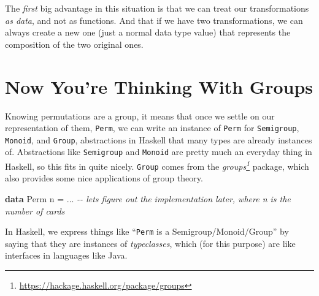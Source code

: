 \documentclass[]{article}
\newenvironment{Shaded}{}{}
\newcommand{\CommentTok}[1]{\textcolor[rgb]{0.38,0.63,0.69}{\textit{#1}}}
\newcommand{\DataTypeTok}[1]{\textcolor[rgb]{0.56,0.13,0.00}{#1}}
\newcommand{\KeywordTok}[1]{\textcolor[rgb]{0.00,0.44,0.13}{\textbf{#1}}}
\newcommand{\NormalTok}[1]{#1}
\newcommand{\OperatorTok}[1]{\textcolor[rgb]{0.40,0.40,0.40}{#1}}
\newcommand{\OtherTok}[1]{\textcolor[rgb]{0.00,0.44,0.13}{#1}}
\renewcommand{\href}[2]{#2\footnote{\url{#1}}}
\begin{document}
The \emph{first} big advantage in this situation is that we can treat our
transformations \emph{as data}, and not as functions. And that if we have two
transformations, we can always create a new one (just a normal data type value)
that represents the composition of the two original ones.

\section{Now You're Thinking With Groups}\label{now-youre-thinking-with-groups}

Knowing permutations are a group, it means that once we settle on our
representation of them, \texttt{Perm}, we can write an instance of \texttt{Perm}
for \texttt{Semigroup}, \texttt{Monoid}, and \texttt{Group}, abstractions in
Haskell that many types are already instances of. Abstractions like
\texttt{Semigroup} and \texttt{Monoid} are pretty much an everyday thing in
Haskell, so this fits in quite nicely. \texttt{Group} comes from the
\emph{\href{https://hackage.haskell.org/package/groups}{groups}} package, which
also provides some nice applications of group theory.

\begin{Shaded}
\begin{Highlighting}[]
\KeywordTok{data} \DataTypeTok{Perm}\NormalTok{ n }\OtherTok{=} \OperatorTok{...} \CommentTok{{-}{-} let\textquotesingle{}s figure out the implementation later, where n is the number of cards}
\end{Highlighting}
\end{Shaded}

In Haskell, we express things like ``\texttt{Perm} is a Semigroup/Monoid/Group''
by saying that they are instances of \emph{typeclasses}, which (for this
purpose) are like interfaces in languages like Java.
\end{document}
